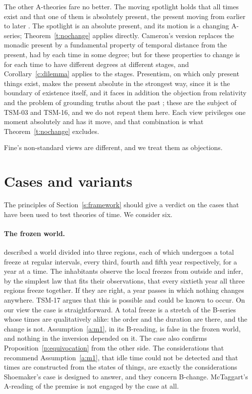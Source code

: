 \documentclass{situationist-preprint}
\begin{document}
The other A-theories fare no better. The moving spotlight holds that all times exist and that one of them is absolutely present, the present moving from earlier to later \citep{Cameron2015,Skow2015}. The spotlight is an absolute present, and its motion is a changing A-series; Theorem~\ref{t:nochange} applies directly. Cameron's version replaces the monadic present by a fundamental property of temporal distance from the present, had by each time in some degree; but for these properties to change is for each time to have different degrees at different stages, and Corollary~\ref{c:dilemma} applies to the stages. Presentism, on which only present things exist, makes the present absolute in the strongest way, since it is the boundary of existence itself, and it faces in addition the objection from relativity and the problem of grounding truths about the past \citep{Markosian2004}; these are the subject of TSM-03 and TSM-16, and we do not repeat them here. Each view privileges one moment absolutely and has it move, and that combination is what Theorem~\ref{t:nochange} excludes.

Fine's non-standard views are different, and we treat them as objections.

\section{Cases and variants}\label{s:cases}

The principles of Section~\ref{s:framework} should give a verdict on the cases that have been used to test theories of time. We consider six.

\paragraph{The frozen world.} \citet{Shoemaker1969} described a world divided into three regions, each of which undergoes a total freeze at regular intervals, every third, fourth and fifth year respectively, for a year at a time. The inhabitants observe the local freezes from outside and infer, by the simplest law that fits their observations, that every sixtieth year all three regions freeze together. If they are right, a year passes in which nothing changes anywhere. TSM-17 argues that this is possible and could be known to occur. On our view the case is straightforward. A total freeze is a stretch of the B-series whose times are qualitatively alike: the order and the duration are there, and the change is not. Assumption~\ref{a:m1}, in its B-reading, is false in the frozen world, and nothing in the inversion depended on it. The case also confirms Proposition~\ref{p:equivocation} from the other side. The considerations that recommend Assumption~\ref{a:m1}, that idle time could not be detected and that times are constructed from the states of things, are exactly the considerations Shoemaker's case is designed to answer, and they concern B-change. McTaggart's A-reading of the premise is not engaged by the case at all.
\end{document}
